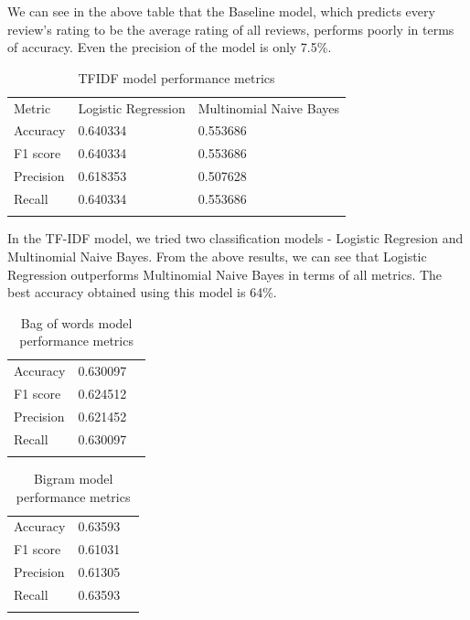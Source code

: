 \documentclass[paper=a4, fontsize=11pt]{scrartcl} %
\numberwithin{equation}{section} %
\numberwithin{figure}{section} %
\numberwithin{table}{section} %
\begin{document}
We can see in the above table that the Baseline model, which predicts every review's rating to be the average rating of all reviews, performs poorly in terms of accuracy. Even the precision of the model is only 7.5\%.

\begin{table}[!htb]
 \centering
 \caption{TFIDF model performance metrics}
 \label{tfidf_performance}
 \begin{tabular}{l l l} 
    \noalign{\smallskip}\hline\noalign{\smallskip}
    Metric & Logistic Regression & Multinomial Naive Bayes\\
    \noalign{\smallskip}\hline\noalign{\smallskip}
    Accuracy & 0.640334	& 0.553686\\
    F1 score & 0.640334	& 0.553686\\
    Precision & 0.618353 & 0.507628\\
    Recall & 0.640334 & 0.553686\\
    \noalign{\smallskip}\hline
  \end{tabular} 
\end{table}  

In the TF-IDF model, we tried two classification models - Logistic Regresion and Multinomial Naive Bayes. From the above results, we can see that Logistic Regression outperforms Multinomial Naive Bayes in terms of all metrics. The best accuracy obtained using this model is 64\%.	

\begin{table}[!htb]
 \centering
 \caption{Bag of words model performance metrics}
 \label{bow_performance}
 \begin{tabular}{l l l} 
    \noalign{\smallskip}\hline\noalign{\smallskip}
    Accuracy & 0.630097\\
    F1 score & 0.624512\\
    Precision & 0.621452\\
    Recall & 0.630097\\
    \noalign{\smallskip}\hline
  \end{tabular} 
\end{table}  

\begin{table}[!htb]
 \centering
 \caption{Bigram model performance metrics}
 \label{bigram_performance}
 \begin{tabular}{l l l} 
    \noalign{\smallskip}\hline\noalign{\smallskip}
    Accuracy & 0.63593\\
    F1 score & 0.61031\\
    Precision & 0.61305\\
    Recall & 0.63593\\
    \noalign{\smallskip}\hline
  \end{tabular} 
\end{table}  
\end{document}
